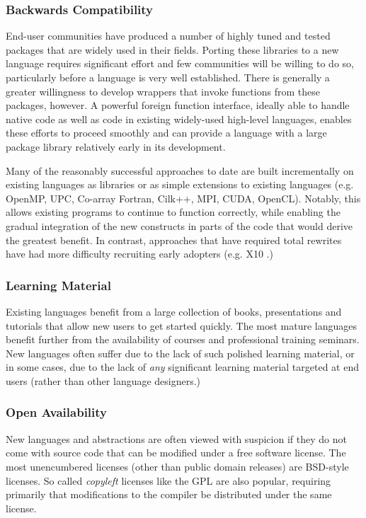 \subsubsection{Backwards Compatibility}
End-user communities have produced a number of highly tuned and tested packages that are widely used in their fields. Porting these libraries to a new language requires significant effort and few communities will be willing to do so, particularly before a language is very well established. There is generally a greater willingness to develop wrappers that invoke functions from these packages, however. A powerful foreign function interface, ideally able to handle native code as well as code in existing widely-used high-level languages, enables these efforts to proceed smoothly and can provide a language with a large package library relatively early in its development. 

Many of the reasonably successful approaches to date are built incrementally on existing languages as libraries or as simple  extensions to existing languages (e.g. OpenMP, UPC, Co-array Fortran, Cilk++, MPI, CUDA, OpenCL). Notably, this allows existing programs to continue to function correctly, while enabling the gradual integration of the new constructs in parts of the code that would derive the greatest benefit. In contrast, approaches that have required total rewrites have had more difficulty recruiting early adopters (e.g. X10 \cite{charles2005x10}.)

\subsubsection{Learning Material}
Existing languages benefit from a large collection of books, presentations and tutorials that allow new users to get started quickly. The most mature languages benefit further from the availability of courses and professional training seminars. New languages often suffer due to the lack of such polished learning material, or in some cases, due to the lack of {\it any} significant learning material targeted at end users (rather than other language designers.)

\subsubsection{Open Availability}
New languages and abstractions are often viewed with suspicion if they do not come with source code that can be modified under a free software license. The most unencumbered licenses (other than public domain releases) are BSD-style licenses. So called {\it copyleft} licenses like the GPL are also popular, requiring primarily that modifications to the compiler be distributed under the same license.

